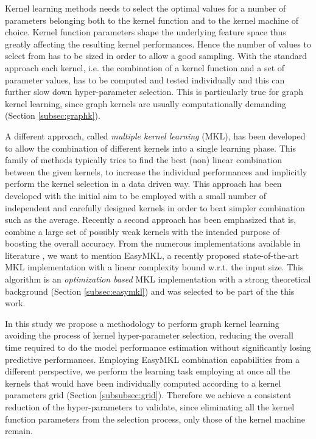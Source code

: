 
Kernel learning methods needs to select the optimal values for a number of parameters
belonging both to the kernel function and to the kernel machine of choice.
Kernel function parameters shape the underlying feature space thus greatly affecting
the resulting kernel performances. Hence the number of values to select from has
to be sized in order to allow a good sampling.
With the standard approach each kernel, i.e. the combination of a kernel function
and a set of parameter values, has to be computed and tested individually and this can
further slow down hyper-parameter selection.
This is particularly true for graph kernel learning, since graph kernels are usually
computationally demanding (Section \ref{subsec:graphk}).


A different approach, called \emph{multiple kernel learning} (MKL), has been
developed to allow the combination of different kernels into a single learning phase.
This family of methods typically tries to find the best (non) linear combination between the
given kernels, to increase the individual performances and implicitly perform the
kernel selection in a data driven way.
This approach has been developed with the initial aim to be employed with a small
number of independent and carefully designed kernels in order to beat simpler combination
such as the average.
Recently a second approach has been emphasized that is, combine a large set of possibly
weak kernels with the intended purpose of boosting the overall accuracy.
From the numerous implementations available in literature \cite{journals/jmlr/GonenA11},
we want to mention EasyMKL, a recently proposed state-of-the-art MKL implementation
\cite{aiolli2015easymkl} with a linear complexity bound w.r.t. the input size.
This algorithm is an \emph{optimization based} MKL implementation with a strong
theoretical background (Section \ref{subsec:easymkl}) and was selected to be part
of the this work.

In this study we propose a methodology to perform graph kernel learning avoiding
the process of kernel hyper-parameter selection, reducing the overall time
required to do the model performance estimation without significantly losing
predictive performances.
Employing EasyMKL combination capabilities from a different perspective, we
perform the learning task employing at once all the kernels that would have been
individually computed according to a kernel parameters grid (Section \ref{subsubsec:grid}).
Therefore we achieve a consistent reduction of the hyper-parameters to validate, since
eliminating all the kernel function parameters from the selection process, only those of the
kernel machine remain.

